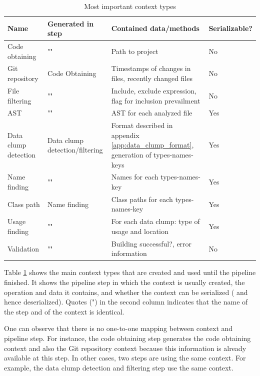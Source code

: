 \begin{table}[ht!]
    \centering
    \begin{tabular}{m{3cm}|m{2cm}|m{5cm}|m{2cm}}
        Name & Generated in step & Contained data/methods & Serializable?  \\\hline
        Code obtaining & "" & Path to project & No \\\hline
        Git repository & Code Obtaining & Timestamps of changes in files, recently changed files & No \\\hline
        File filtering & "" & Include, exclude expression, flag for inclusion prevailment & No \\\hline

        AST & "" & \ac{AST} for each analyzed file &  Yes \\\hline
         Data clump detection & Data clump detection/filtering  & Format described in appendix \ref{app:data_clump_format}, generation of types-names-keys & Yes \\\hline 
         Name finding & "" & Names for each types-names-key & Yes\\\hline

         Class path & Name finding & Class paths for each types-names-key & Yes\\\hline

         Usage finding & "" & For each data clump: type of usage and  location & Yes \\\hline

         Validation & "" & Building successful?, error information & No \\\hline
         
    \end{tabular}
    \caption{Most important context types}
    \label{tab:context_types}
\end{table}

Table \ref{tab:context_types} shows the main context types that are created and used until the pipeline finished. It shows the pipeline step in which the context is usually created, the operation and data it contains, and whether the context can be serialized ( and hence deserialized). Quotes (") in the second column indicates that the name of the step and of the context is identical. 

One can observe that there is no one-to-one mapping between context and pipeline step. For instance, the code obtaining step generates the code obtaining context and also the Git repository context because this information is already available at this step. In other cases, two steps are using the same context. For example, the data clump detection and filtering step use the same context.


